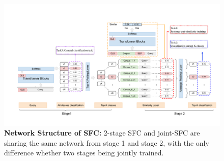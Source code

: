 \begin{figure}[t]
  \begin{centering}
    \includegraphics[scale=0.66]{picture/picture4} 
    \par
  \end{centering}
  \caption{
    \textbf{Network Structure of SFC:} 2-stage SFC and joint-SFC are sharing
    the  same  network  from  stage  1  and  stage 2, with the only difference
    whether two stages being jointly trained.
  }
  \label{fig:framework}
\end{figure}


